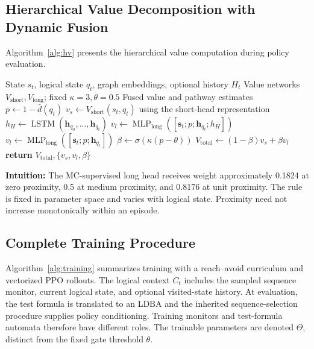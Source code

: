 \documentclass[journal]{IEEEtran}
\begin{document}
\subsection{Hierarchical Value Decomposition with Dynamic Fusion}

Algorithm~\ref{alg:hv} presents the hierarchical value computation during policy evaluation.

\begin{algorithm}[h]
\caption{Hierarchical Value Estimation}
\label{alg:hv}
\begin{algorithmic}[1]
\REQUIRE State $s_t$, logical state $q_t$, graph embeddings, optional history $H_t$
\REQUIRE Value networks $V_{\mathrm{short}},V_{\mathrm{long}}$; fixed $\kappa=3,\theta=0.5$
\ENSURE Fused value and pathway estimates
\STATE $p\gets1-\bar d(q_t)$
\STATE $v_s\gets V_{\mathrm{short}}(s_t,q_t)$ using the short-head representation
 \STATE $h_H\gets\operatorname{LSTM}(\mathbf h_{q_0},\ldots,\mathbf h_{q_t})$
  \STATE $v_l\gets\operatorname{MLP}_{\mathrm{long}}([\mathbf s_t;p;\mathbf h_{q_t};h_H])$
\ELSE
  \STATE $v_l\gets\operatorname{MLP}_{\mathrm{long}}([\mathbf s_t;p;\mathbf h_{q_t}])$
\ENDIF
\STATE $\beta\gets\sigma(\kappa(p-\theta))$
\STATE $V_{\mathrm{total}}\gets(1-\beta)v_s+\beta v_l$
\STATE \textbf{return} $V_{\mathrm{total}},\{v_s,v_l,\beta\}$
\end{algorithmic}
\end{algorithm}

\textbf{Intuition:} The MC-supervised long head receives weight approximately 0.1824 at zero proximity, 0.5 at medium proximity, and 0.8176 at unit proximity. The rule is fixed in parameter space and varies with logical state. Proximity need not increase monotonically within an episode.

\subsection{Complete Training Procedure}

Algorithm~\ref{alg:training} summarizes training with a reach--avoid curriculum and vectorized PPO rollouts. The logical context $C_t$ includes the sampled sequence monitor, current logical state, and optional visited-state history. At evaluation, the test formula is translated to an LDBA and the inherited sequence-selection procedure supplies policy conditioning. Training monitors and test-formula automata therefore have different roles. The trainable parameters are denoted $\Theta$, distinct from the fixed gate threshold $\theta$.
\end{document}
